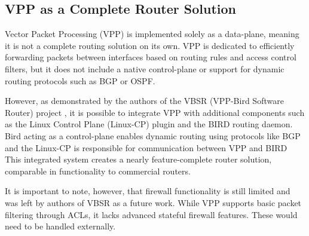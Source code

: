 
\subsection{VPP as a Complete Router Solution}
Vector Packet Processing (VPP) is implemented solely as a data-plane, meaning it is not a complete routing solution on its own. 
VPP is dedicated to efficiently forwarding packets between interfaces based on routing rules and access control filters, 
but it does not include a native control-plane or support for dynamic routing protocols such as BGP or OSPF.

However, as demonstrated by the authors of the VBSR (VPP-Bird Software Router) project \cite{10819057}, 
it is possible to integrate VPP with additional components such as the Linux Control Plane (Linux-CP) plugin and the BIRD routing daemon. 
Bird acting as a control-plane enables dynamic routing using protocols like BGP 
and the Linux-CP is responsible for communication between VPP and BIRD 
This integrated system creates a nearly feature-complete router solution, comparable in functionality to commercial routers.

It is important to note, however, that firewall functionality is still limited and was left by authors of VBSR as a future work.\cite{10819057} 
While VPP supports basic packet filtering through ACLs, it lacks advanced stateful firewall features\cite{fdio-vpp-features-2502}. These would need to be handled externally.

